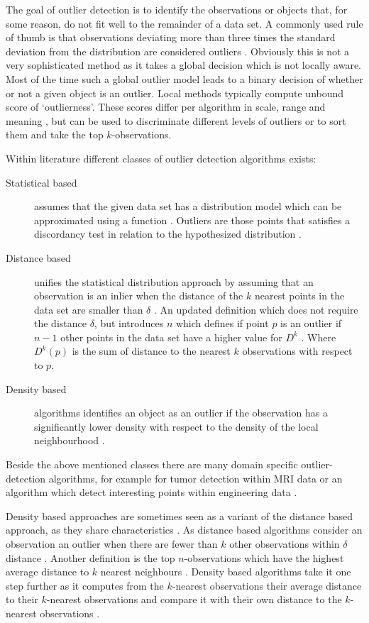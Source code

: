 The goal of outlier detection is to identify the observations or objects that, for some reason, do not fit well to the remainder of a data set. A commonly used rule of thumb is that observations deviating more than three times the standard deviation from the distribution are considered outliers \cite{9783540262565}. Obviously this is not a very sophisticated method as it takes a global decision which is not locally aware. Most of the time such a global outlier model leads to a binary decision of whether or not a given object is an outlier. Local methods typically compute unbound score of `outlierness'. These scores differ per algorithm in scale, range and meaning \cite{4053049}, but can be used to discriminate different levels of outliers or to sort them and take the top $k$-observations.


Within literature different classes of outlier detection algorithms exists:
\begin{description}
 \item[Statistical based] assumes that the given data set has a distribution model which can be approximated using a function \cite{Hadi2009}. Outliers are those points that satisfies a discordancy test in relation to the hypothesized distribution \cite{barnett1994outliers}. 
 \item[Distance based] unifies the statistical distribution approach \cite{Knorr:1997:UAM:782010.782021} by assuming that an observation is an inlier when the distance of the $k$ nearest points in the data set are smaller than $\delta$ \cite{Knorr98algorithmsfor}. An updated definition which does not require the distance $\delta$, but introduces $n$ which defines if point $p$ is an outlier if $n-1$ other points in the data set have a higher value for $D^{k}$ \cite{Ramaswamy:2000:EAM:335191.335437}. Where $D^{k}(p)$ is the sum of distance to the nearest $k$ observations with respect to $p$.
 \item[Density based] algorithms identifies an object as an outlier if the observation has a significantly lower density with respect to the density of the local neighbourhood \cite{Breunig:2000:LID:335191.335388,Breunig:2000:LID:342009.335388}.
\end{description}
Beside the above mentioned classes there are many domain specific outlier-detection algorithms, for example for tumor detection within MRI data \cite{991693} or an algorithm which detect interesting points within engineering data \cite{rog}.

Density based approaches are sometimes seen as a variant of the distance based approach, as they share characteristics \cite{Kriegel:2008:AOD:1401890.1401946}. As distance based algorithms consider an observation an outlier when there are fewer than $k$ other observations within $\delta$ distance  \cite{Knorr:1999:FIK:645925.671529,Knorr:2000:DOA:764212.764218}. Another definition is the top $n$-observations which have the highest average distance to $k$ nearest neighbours \cite{fastoutlier,Eskin02ageometric}. Density based algorithms take it one step further as it computes from the $k$-nearest observations their average distance to their $k$-nearest observations and compare it with their own distance to the $k$-nearest observations \cite{Schubert:2014:LOD:2560809.2560914}.

